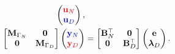 \documentclass[aspectratio=169]{ISAE-Beamer}
\begin{document}
\begin{frame}
\begin{equation*}
\begin{aligned}
\begin{pmatrix}
	\textcolor{red}{\mathbf{u}_N} \\
	\textcolor{blue}{\mathbf{u}_D} \\
	\end{pmatrix}, \\
	\begin{bmatrix}
	\mathbf{M}_{\Gamma_N} & \mathbf{0} \\
	\mathbf{0} & \mathbf{M}_{\Gamma_D} \\
	\end{bmatrix}
	\begin{pmatrix}
	\textcolor{blue}{\mathbf{y}_N} \\
	\textcolor{red}{\mathbf{y}_D} \\
	\end{pmatrix} &=
	\begin{bmatrix}
	\mathbf{B}_N^\top & \mathbf{0} \\ 
	\mathbf{0} & \mathbf{B}_D^\top \\ 
	\end{bmatrix}
	\begin{pmatrix}
	\mathbf{e}\\
	\bm{\lambda}_D \\
	\end{pmatrix}.
	\end{aligned}
	\end{equation*}
	
\end{frame}
\end{document}
